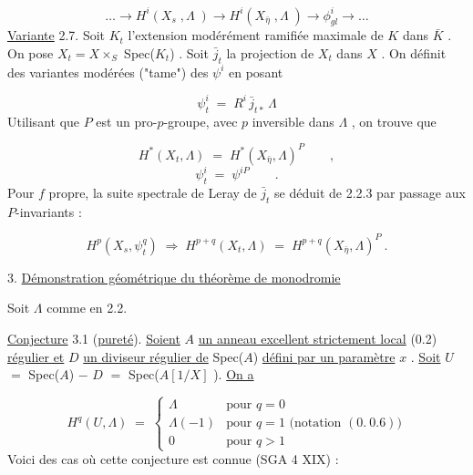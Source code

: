 \begin{equation*}\tag{2.6.2}
\dots \longrightarrow H^i(X_s\;,\Lambda\;) \longrightarrow H^i(X_{\bar{\eta}}\;,\Lambda\;) \longrightarrow \phi^i_{gl} \longrightarrow \dots
\end{equation*}
\underline{Variante} 2.7.  Soit  $K_t$  l'extension modérément ramifiée maximale de  $K$  dans  $\bar{K}$ . On pose  $X_t = X \times_S$ Spec($K_t$) . Soit  $\bar{j}_t$  la projection de  $X_t$  dans  $X$ . On définit des variantes modérées  ("tame")  des  $\psi^i$  en posant



\begin{equation*}
\psi^{i}_{t} \;=\; R^{i}\,\bar{j}_{t*}\,\Lambda
\end{equation*}
Utilisant que  $P$  est un pro-$p$-groupe, avec  $p$  inversible dans  $\Lambda$ , on trouve que

\begin{equation}\tag{2.7.1}
H^{*}(X_{t},\Lambda) \;=\; H^{*}(X_{\bar{\eta}},\Lambda)^{P} \qquad ,
\end{equation}
\begin{equation}\tag{2.7.2}
\psi^{i}_{t} \;=\; \psi^{iP} \qquad .
\end{equation}
Pour  $f$  propre, la suite spectrale de Leray de  $\bar{j}_{t}$  se déduit de 2.2.3 par passage aux  $P$-invariants :

\begin{equation}\tag{2.7.3}
H^{p}(X_{s},\psi^{q}_{t}) \;\Longrightarrow\; H^{p+q}(X_{t},\Lambda) \;=\; H^{p+q}(X_{\bar{\eta}},\Lambda)^{P}\ .
\end{equation}

3. \underline{Démonstration géométrique du théorème de monodromie}

Soit  $\Lambda$  comme en 2.2.

\underline{Conjecture} 3.1 (\underline{pureté}). \underline{Soient} $A$ \underline{un anneau excellent strictement local} (0.2) \underline{régulier et} $D$ \underline{un diviseur régulier de} Spec($A$) \underline{défini par un paramètre} $x$ . \underline{Soit} $U$ $=$ Spec($A$) $-$ $D$ $=$ Spec($A\left[1/X\right]$ ). \underline{On a}

\begin{equation}\tag{3.1.1}
H^{q}(U,\Lambda) \;=\; \left\{\begin{array}{ll} \Lambda & \text{pour } q = 0 \\[4pt] \Lambda(-1) & \text{pour } q = 1 \text{ (notation } (0.\ 0.6)) \\[4pt] 0 & \text{pour } q > 1 \end{array}\right.
\end{equation}
Voici des cas où cette conjecture est connue (SGA 4 XIX) :

